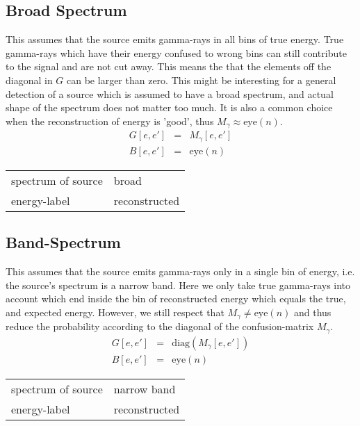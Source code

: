 \documentclass{article}%
\begin{document}
\subsection{Broad Spectrum}
%
This assumes that the source emits gamma-rays in all bins of true energy.
%
True gamma-rays which have their energy confused to wrong bins can still contribute to the signal and are not cut away.
%
This means the that the elements off the diagonal in $G$ can be larger than zero.
%
This might be interesting for a general detection of a source which is assumed to have a broad spectrum, and actual shape of the spectrum does not matter too much.
%
It is also a common choice when the reconstruction of energy is 'good', thus $M_\gamma \approx \mathrm{eye}(n)$.
%
\begin{eqnarray}
G[e, e'] &=& M_{\gamma}[e, e']
\\
B[e, e'] &=& \mathrm{eye}(n)
\end{eqnarray}
%
\begin{center}
\begin{tabular}{ll}
spectrum of source & broad\\
energy-label & reconstructed\\
\end{tabular}
\end{center}
%
\subsection{Band-Spectrum}
%
This assumes that the source emits gamma-rays only in a single bin of energy, i.e. the source's spectrum is a narrow band.
%
Here we only take true gamma-rays into account which end inside the bin of reconstructed energy which equals the true, and expected energy.
%
However, we still respect that $M_{\gamma} \neq \mathrm{eye}(n)$ and thus reduce the probability according to the diagonal of the confusion-matrix $M_{\gamma}$.
%
\begin{eqnarray}
G[e, e'] &=& \mathrm{diag}(M_{\gamma}[e, e'])
\\
B[e, e'] &=& \mathrm{eye}(n)
\end{eqnarray}
%
\begin{center}
\begin{tabular}{ll}
spectrum of source & narrow band\\
energy-label & reconstructed\\
\end{tabular}
\end{center}
%
\end{document}
